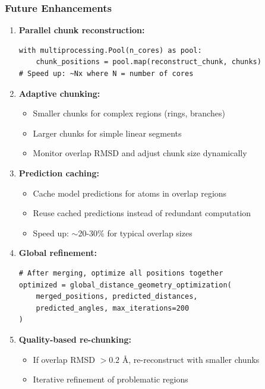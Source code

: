 \documentclass[11pt,a4paper]{article}
\begin{document}
\subsubsection{Future Enhancements}

\begin{enumerate}
    \item \textbf{Parallel chunk reconstruction:}
    \begin{lstlisting}
with multiprocessing.Pool(n_cores) as pool:
    chunk_positions = pool.map(reconstruct_chunk, chunks)
# Speed up: ~Nx where N = number of cores
    \end{lstlisting}

    \item \textbf{Adaptive chunking:}
    \begin{itemize}
        \item Smaller chunks for complex regions (rings, branches)
        \item Larger chunks for simple linear segments
    \item Monitor overlap RMSD and adjust chunk size dynamically
    \end{itemize}

    \item \textbf{Prediction caching:}
    \begin{itemize}
        \item Cache model predictions for atoms in overlap regions
        \item Reuse cached predictions instead of redundant computation
        \item Speed up: $\sim$20-30\% for typical overlap sizes
    \end{itemize}

    \item \textbf{Global refinement:}
    \begin{lstlisting}
# After merging, optimize all positions together
optimized = global_distance_geometry_optimization(
    merged_positions, predicted_distances,
    predicted_angles, max_iterations=200
)
    \end{lstlisting}

    \item \textbf{Quality-based re-chunking:}
    \begin{itemize}
        \item If overlap RMSD $> 0.2$ Å, re-reconstruct with smaller chunks
        \item Iterative refinement of problematic regions
    \end{itemize}
\end{enumerate}
\end{document}
